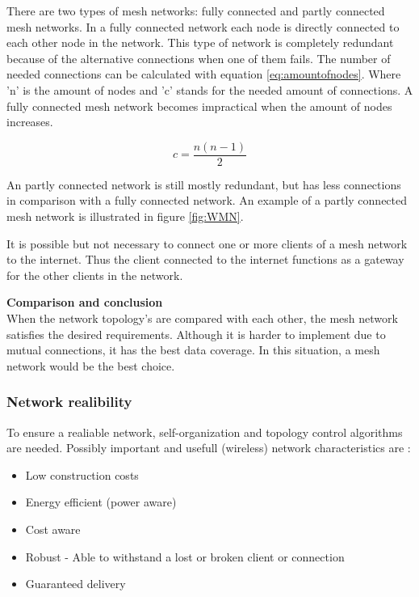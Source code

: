 \documentclass[10pt,a4paper]{article}
\begin{document}
There are two types of mesh networks: fully connected and partly connected mesh networks. In a fully connected network each node is directly connected to each other node in the network. This type of network is completely redundant because of the alternative connections when one of them fails. The number of needed connections can be calculated with equation \ref{eq:amountofnodes}\cite{combook}. Where 'n' is the amount of nodes and 'c' stands for the needed amount of connections. A fully connected mesh network becomes impractical when the amount of nodes increases.

\begin{equation}
c=\frac{n(n-1)}{2}
\label{eq:amountofnodes}
\end{equation}

An partly connected network is still mostly redundant, but has less connections in comparison with a fully connected network. An example of a partly connected mesh network is illustrated in figure \ref{fig:WMN}. \cite{combook} 

It is possible but not necessary to connect one or more clients of a mesh network to the internet. Thus the client connected to the internet functions as a gateway for the other clients in the network. \cite{wirelessmeshnetworksopportunitiesandchallenges}


\textbf{Comparison and conclusion}\\
When the network topology's are compared with each other, the mesh network satisfies the desired requirements. Although it is harder to implement due to mutual connections, it has the best data coverage. In this situation, a mesh network would be the best choice.

\subsubsection{Network realibility}
To ensure a realiable network, self-organization and topology control algorithms are needed.\cite{WMN1} Possibly important and usefull (wireless) network characteristics are \cite{position-based}:
\begin{itemize}
\setlength\itemsep{0em}
    \item Low construction costs
    \item Energy efficient (power aware)
    \item Cost aware
    \item Robust - Able to withstand a lost or broken client or connection
    \item Guaranteed delivery
\end{itemize}
\end{document}
